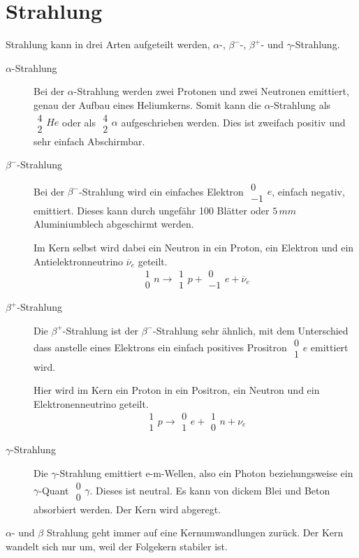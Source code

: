 \documentclass{article}
\newcommand{\e}{\ksymb{0}{-1}{e}}
\newcommand{\p}{\ksymb{1}{1}{p}}
\newcommand{\n}{\ksymb{1}{0}{n}}
\newcommand{\ksymb}[3]{\substack{#1 \\ #2}#3}
\begin{document}
\section{Strahlung} 
Strahlung kann in drei Arten aufgeteilt werden, $\alpha$-, $\beta^-$-, $\beta^+$- und $\gamma$-Strahlung. 
\begin{description}
 \item[$\alpha$-Strahlung] Bei der $\alpha$-Strahlung werden zwei Protonen und zwei Neutronen emittiert, genau der Aufbau eines Heliumkerns. Somit kann die $\alpha$-Strahlung als $\ksymb{4}{2}{He}$ oder als $\ksymb{4}{2}{\alpha}$ aufgeschrieben werden. Dies ist zweifach positiv und sehr einfach Abschirmbar. 
 \item[$\beta^-$-Strahlung] Bei der $\beta^-$-Strahlung wird ein einfaches Elektron $\e$, einfach negativ, emittiert. Dieses kann durch ungefähr 100 Blätter oder $5\,mm$ Aluminiumblech abgeschirmt werden.
 
Im Kern selbst wird dabei ein Neutron in ein Proton, ein Elektron und ein Antielektronneutrino $\overline{\nu}_e$ geteilt.
\[
 \n \rightarrow \p + \e + \overline{\nu}_e
\] 
 \item[$\beta^+$-Strahlung] Die $\beta^+$-Strahlung ist der $\beta^-$-Strahlung sehr ähnlich, mit dem Unterschied dass anstelle eines Elektrons ein einfach positives Prositron $\ksymb{0}{1}{e}$ emittiert wird.
 
Hier wird im Kern ein Proton in ein Positron, ein Neutron und ein Elektronenneutrino geteilt.
\[
 \p \rightarrow \ksymb{0}{1}{e} + \n + \nu_e
\]
 \item[$\gamma$-Strahlung] Die $\gamma$-Strahlung emittiert e-m-Wellen, also ein Photon beziehungsweise ein $\gamma$-Quant $\ksymb{0}{0}{\gamma}$. Dieses ist neutral. Es kann von dickem Blei und Beton absorbiert werden. Der Kern wird abgeregt.
\end{description}
$\alpha$- und $\beta$ Strahlung geht immer auf eine Kernumwandlungen zurück. Der Kern wandelt sich nur um, weil der Folgekern stabiler ist. 
 
\end{document}
